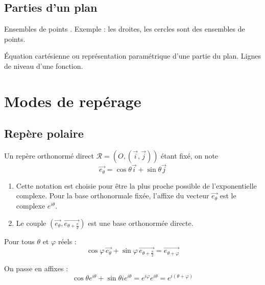 \subsection{Parties d'un plan}
Ensembles de points . Exemple : les droites, les cercles sont des ensembles de points.

\'Equation cartésienne ou représentation paramétrique d'une partie du plan. Lignes de niveau d'une fonction.

\section{Modes de repérage}
\subsection{Repère polaire}
\begin{defi}
 Un repère orthonormé direct $\mathcal{R}=\left(O,(\overrightarrow i , \overrightarrow j) \right)$ étant fixé, on note
\begin{displaymath}
 \overrightarrow{e_\theta} = \cos\theta \overrightarrow i +\sin\theta \overrightarrow j
\end{displaymath}
\end{defi}
\begin{rems}
 \begin{enumerate}
  \item  Cette notation est choisie pour être la plus proche possible de l'exponentielle complexe. Pour la base orthonormale fixée, l'affixe du vecteur $\overrightarrow{e_\theta}$ est le complexe $e^{i\theta}$. 
\item Le couple $\left( \overrightarrow{e_\theta}, \overrightarrow{e_{\theta + \frac{\pi}{2}}}\right)$ est une base orthonormée directe.  
 \end{enumerate}
\end{rems}
\begin{prop}
 Pour tous $\theta$ et $\varphi$ réels :
\begin{displaymath}
 \cos \varphi \,\overrightarrow{e_\theta} + \sin \varphi \,\overrightarrow{e_{\theta + \frac{\pi}{2}}}
= \overrightarrow{e_{\theta + \varphi}}  
\end{displaymath}
\end{prop}
\begin{demo}
 On passe en affixes :
\begin{displaymath}
 \cos \theta e^{i\theta} + \sin \theta i e^{i\theta} = e^{i\varphi}e^{i\theta}= e^{i(\theta + \varphi)}
\end{displaymath}

\end{demo}

